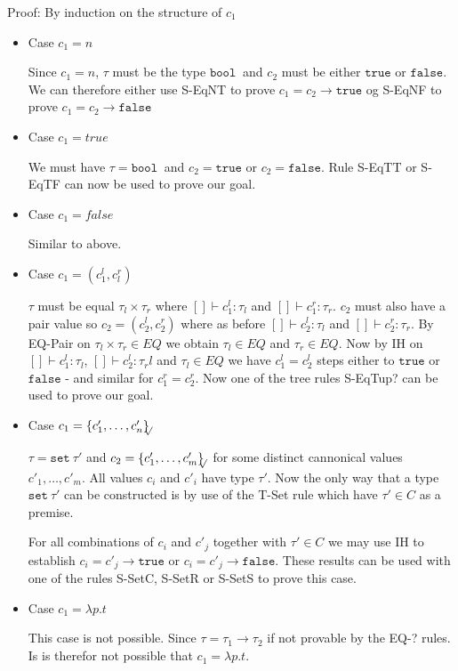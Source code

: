 \documentclass[a4paper]{article}
\newcommand{\s}[1]{\mathtt{#1}}
\newcommand{\sLb}{\s{\{}}
\newcommand{\sRb}{\s{\}}}
\newcommand{\sbool}{\s{bool\ }}
\newcommand{\sseta}{\s{set\ }}
\newcommand{\strue}{\s{true}}
\newcommand{\sfalse}{\s{false}}
\newcommand{\sset}[1]{\sLb #1 \sRb}
\newcommand{\ssetc}[1]{\sset{#1}_{\!\!\!\surd}}
\newcommand{\step}{\to}
\begin{document}
Proof: By induction on the structure of $c_1$
\begin{itemize}
\item Case $c_1 = n$

Since $c_1 = n$, $\tau$ must be the type $\sbool$ and $c_2$ must be either $\strue$ or $\sfalse$. We can therefore either use S-EqNT to prove $c_1 = c_2 \step \strue$ og S-EqNF to prove $c_1 = c_2 \step \sfalse$

\item Case $c_1 = true$

We must have $\tau = \sbool$ and $c_2 = \strue$ or $c_2 = \sfalse$. Rule S-EqTT or S-EqTF can now be used to prove our goal.

\item Case $c_1 = false$

Similar to above.

\item Case $c_1 = (c_1^l, c_l^r)$

$\tau$ must be equal $\tau_l \times \tau_r$ where $[]\vdash c_1^l:\tau_l$ and $[]\vdash c_1^r:\tau_r$. $c_2$ must also have a pair value so $c_2 = (c_2^l, c_2^r)$ where as before $[]\vdash c_2^l:\tau_l$ and $[]\vdash c_2^r:\tau_r$. By EQ-Pair on $\tau_l \times \tau_r \in EQ$ we obtain $\tau_l \in EQ$ and $\tau_r \in EQ$. Now by IH on $[]\vdash c_1^l:\tau_l$, $[]\vdash c_2^l:\tau_rl$ and $\tau_l \in EQ$ we have $c_1^l = c_2^l$ steps either to $\strue$ or $\sfalse$ - and similar for $c_1^r = c_2^r$. Now one of the tree rules S-EqTup? can be used to prove our goal.

\item Case $c_1 = \ssetc{c'_1,\ldots,c'_n}$

$\tau = \sseta \tau'$ and $c_2 = \ssetc{c'_1,\ldots,c'_m}$ for some distinct cannonical values $c'_1,\ldots,c'_m$. All values $c_i$ and $c'_i$ have type $\tau'$. Now the only way that a type $\sseta \tau'$ can be constructed is by use of the T-Set rule which have $\tau' \in C$ as a premise.

For all combinations of $c_i$ and $c'_j$ together with $\tau' \in C$ we may use IH to establish $c_i = c'_j \step \strue$ or $c_i = c'_j \step \sfalse$. These results can be used with one of the rules S-SetC, S-SetR or S-SetS to prove this case.

\item Case $c_1 = \lambda p.t$

This case is not possible. Since $\tau = \tau_1 \to \tau_2$ if not provable by the EQ-? rules. Is is therefor not possible that $c_1 = \lambda p.t$.
\end{itemize}
\end{document}
